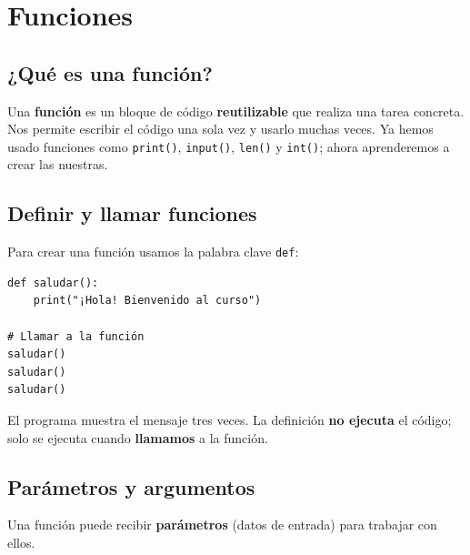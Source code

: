 \documentclass[11pt,a4paper]{article}
\begin{document}
\section{Funciones}

\subsection{¿Qué es una función?}

Una \textbf{función} es un bloque de código \textbf{reutilizable} que realiza una tarea concreta. Nos permite escribir el código una sola vez y usarlo muchas veces. Ya hemos usado funciones como \texttt{print()}, \texttt{input()}, \texttt{len()} y \texttt{int()}; ahora aprenderemos a crear las nuestras.

\subsection{Definir y llamar funciones}

Para crear una función usamos la palabra clave \texttt{def}:

\begin{cajaEjemplo}
\begin{lstlisting}[style=pythonStyle, caption={Mi primera función}]
def saludar():
    print("¡Hola! Bienvenido al curso")

# Llamar a la función
saludar()
saludar()
saludar()
\end{lstlisting}

El programa muestra el mensaje tres veces. La definición \textbf{no ejecuta} el código; solo se ejecuta cuando \textbf{llamamos} a la función.
\end{cajaEjemplo}

\subsection{Parámetros y argumentos}

Una función puede recibir \textbf{parámetros} (datos de entrada) para trabajar con ellos.
\end{document}

